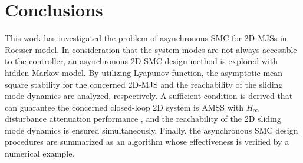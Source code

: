\documentclass[conference]{IEEEtran}
\begin{document}
\section{Conclusions} \label{conclusion} 
This work has investigated the problem of asynchronous SMC for 2D-MJSs in Roesser model. In consideration that the system modes are not always accessible to the controller, an asynchronous 2D-SMC design method is explored with hidden Markov model. By utilizing Lyapunov function, the asymptotic mean square stability for the concerned 2D-MJS  and the reachability of the sliding mode dynamics are analyzed, respectively. A sufficient condition is derived that can guarantee the concerned closed-loop 2D system is AMSS with $H_{\infty}$ disturbance attenuation performance , and  the reachability of the 2D sliding mode dynamics is ensured simultaneously. Finally, the asynchronous SMC design procedures are summarized as an algorithm whose effectiveness is verified by a numerical example.

%
%
\end{document}
